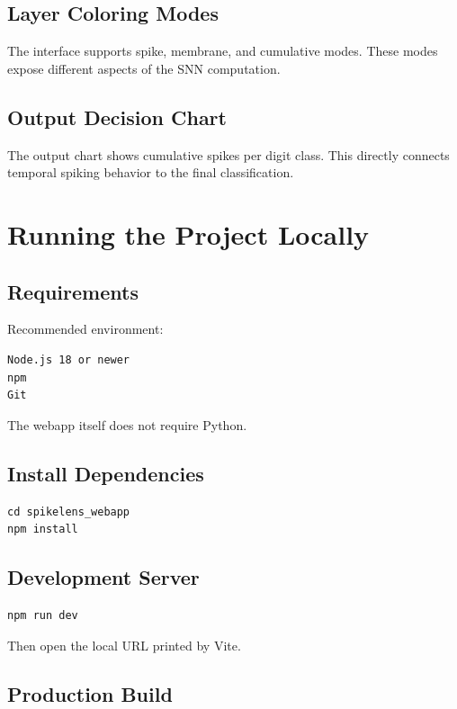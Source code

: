 \documentclass[11pt,a4paper]{article}
\begin{document}
\subsection{Layer Coloring Modes}

The interface supports spike, membrane, and cumulative modes. These modes expose different aspects of the SNN computation.

\subsection{Output Decision Chart}

The output chart shows cumulative spikes per digit class. This directly connects temporal spiking behavior to the final classification.

\section{Running the Project Locally}

\subsection{Requirements}

Recommended environment:

\begin{lstlisting}
Node.js 18 or newer
npm
Git
\end{lstlisting}

The webapp itself does not require Python.

\subsection{Install Dependencies}

\begin{lstlisting}
cd spikelens_webapp
npm install
\end{lstlisting}

\subsection{Development Server}

\begin{lstlisting}
npm run dev
\end{lstlisting}

Then open the local URL printed by Vite.

\subsection{Production Build}
\end{document}
